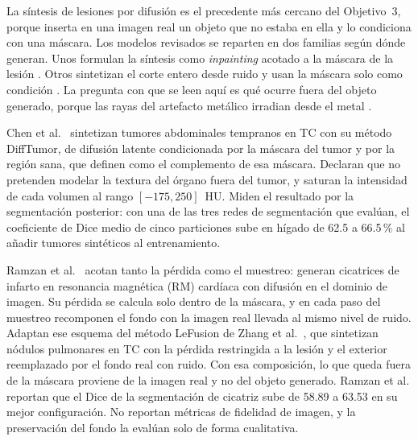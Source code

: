 La síntesis de lesiones por difusión es el precedente más cercano del Objetivo~3, porque inserta en una imagen real un objeto que no estaba en ella y lo condiciona con una máscara. Los modelos revisados se reparten en dos familias según dónde generan. Unos formulan la síntesis como \emph{inpainting} acotado a la máscara de la lesión \cite{chen2024tumorsynthesis,ramzan2026claim,jacob2026lgesynthnet,zhang2025lefusion}. Otros sintetizan el corte entero desde ruido y usan la máscara solo como condición \cite{zhang2025diffboost,konz2024anatomicallycontrollable}. La pregunta con que se leen aquí es qué ocurre fuera del objeto generado, porque las rayas del artefacto metálico irradian desde el metal \cite{deman1999}.

Chen et al.~\cite{chen2024tumorsynthesis} sintetizan tumores abdominales tempranos en TC con su método DiffTumor, de difusión latente condicionada por la máscara del tumor y por la región sana, que definen como el complemento de esa máscara. Declaran que no pretenden modelar la textura del órgano fuera del tumor, y saturan la intensidad de cada volumen al rango $[-175, 250]$~HU. Miden el resultado por la segmentación posterior: con una de las tres redes de segmentación que evalúan, el coeficiente de Dice medio de cinco particiones sube en hígado de 62.5 a 66.5\,\% al añadir tumores sintéticos al entrenamiento.

Ramzan et al.~\cite{ramzan2026claim} acotan tanto la pérdida como el muestreo: generan cicatrices de infarto en resonancia magnética (RM) cardíaca con difusión en el dominio de imagen. Su pérdida se calcula solo dentro de la máscara, y en cada paso del muestreo recomponen el fondo con la imagen real llevada al mismo nivel de ruido. Adaptan ese esquema del método LeFusion de Zhang et al.~\cite{zhang2025lefusion}, que sintetizan nódulos pulmonares en TC con la pérdida restringida a la lesión y el exterior reemplazado por el fondo real con ruido. Con esa composición, lo que queda fuera de la máscara proviene de la imagen real y no del objeto generado. Ramzan et al. reportan que el Dice de la segmentación de cicatriz sube de 58.89 a 63.53 en su mejor configuración. No reportan métricas de fidelidad de imagen, y la preservación del fondo la evalúan solo de forma cualitativa.

